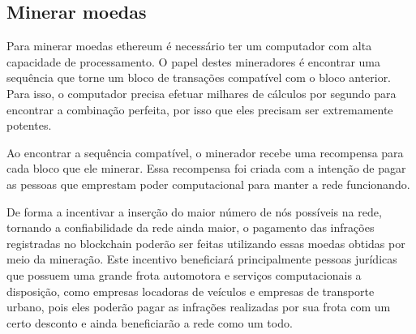         
\subsection{Minerar moedas}

Para minerar moedas ethereum é necessário ter um computador com alta capacidade de processamento. O papel destes mineradores é encontrar uma sequência que torne um bloco de transações compatível com o bloco anterior. Para isso, o computador precisa efetuar milhares de cálculos por segundo para encontrar a combinação perfeita, por isso que eles precisam ser extremamente potentes.

Ao encontrar a sequência compatível, o minerador recebe uma recompensa para cada bloco que ele minerar. Essa recompensa foi criada com a intenção de pagar as pessoas que emprestam poder computacional para manter a rede funcionando.

De forma a incentivar a inserção do maior número de nós possíveis na rede, tornando a confiabilidade da rede ainda maior, o pagamento das infrações registradas no blockchain poderão ser feitas utilizando essas moedas obtidas por meio da mineração. Este incentivo beneficiará principalmente pessoas jurídicas que possuem uma grande frota automotora e serviços computacionais a disposição, como empresas locadoras de veículos e empresas de transporte urbano, pois eles poderão pagar as infrações realizadas por sua frota com um certo desconto e ainda beneficiarão a rede como um todo.
